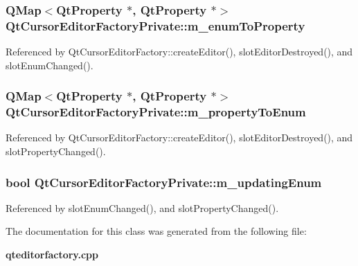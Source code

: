 \subsubsection[{m\+\_\+enum\+To\+Property}]{\setlength{\rightskip}{0pt plus 5cm}Q\+Map$<${\bf Qt\+Property} $\ast$, {\bf Qt\+Property} $\ast$$>$ Qt\+Cursor\+Editor\+Factory\+Private\+::m\+\_\+enum\+To\+Property}\label{classQtCursorEditorFactoryPrivate_a7c8a9b0b7ea2a8b81edf27acc89ed8e1}


Referenced by Qt\+Cursor\+Editor\+Factory\+::create\+Editor(), slot\+Editor\+Destroyed(), and slot\+Enum\+Changed().

\subsubsection[{m\+\_\+property\+To\+Enum}]{\setlength{\rightskip}{0pt plus 5cm}Q\+Map$<${\bf Qt\+Property} $\ast$, {\bf Qt\+Property} $\ast$$>$ Qt\+Cursor\+Editor\+Factory\+Private\+::m\+\_\+property\+To\+Enum}\label{classQtCursorEditorFactoryPrivate_a52f30579fb8c3e403bee25d09dceb2d1}


Referenced by Qt\+Cursor\+Editor\+Factory\+::create\+Editor(), slot\+Editor\+Destroyed(), and slot\+Property\+Changed().

\subsubsection[{m\+\_\+updating\+Enum}]{\setlength{\rightskip}{0pt plus 5cm}bool Qt\+Cursor\+Editor\+Factory\+Private\+::m\+\_\+updating\+Enum}\label{classQtCursorEditorFactoryPrivate_a9567ac6c4efa99185ef34b748c83f0ef}


Referenced by slot\+Enum\+Changed(), and slot\+Property\+Changed().



The documentation for this class was generated from the following file\+:\begin{DoxyCompactItemize}
\item 
{\bf qteditorfactory.\+cpp}\end{DoxyCompactItemize}
